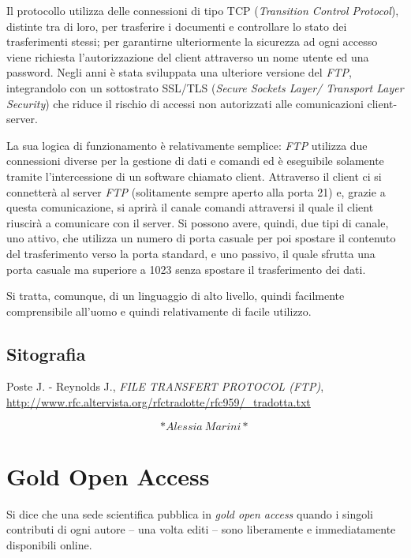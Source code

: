 \documentclass[
  b5paper,
  twoside,
  12pt,
  chapterprefix=false,
  bibliography=totocnumbered,
  parskip=false]{scrbook}
\begin{document}
Il protocollo utilizza delle connessioni di tipo TCP (\emph{Transition
Control Protocol}), distinte tra di loro, per trasferire i documenti e
controllare lo stato dei trasferimenti stessi; per garantirne
ulteriormente la sicurezza ad ogni accesso viene richiesta
l'autorizzazione del client attraverso un nome utente ed una password.
Negli anni è stata sviluppata una ulteriore versione del \emph{FTP},
integrandolo con un sottostrato SSL/TLS (\emph{Secure Sockets Layer/
Transport Layer Security}) che riduce il rischio di accessi non
autorizzati alle comunicazioni client-server.

La sua logica di funzionamento è relativamente semplice: \emph{FTP} utilizza
due connessioni diverse per la gestione di dati e comandi ed è
eseguibile solamente tramite l'intercessione di un software chiamato
client. Attraverso il client ci si connetterà al server \emph{FTP}
(solitamente sempre aperto alla porta 21) e, grazie a questa
comunicazione, si aprirà il canale comandi attraversi il quale il client
riuscirà a comunicare con il server. Si possono avere, quindi, due tipi
di canale, uno attivo, che utilizza un numero di porta casuale per poi
spostare il contenuto del trasferimento verso la porta standard, e uno
passivo, il quale sfrutta una porta casuale ma superiore a 1023 senza
spostare il trasferimento dei dati.

Si tratta, comunque, di un linguaggio di alto livello, quindi facilmente
comprensibile all'uomo e quindi relativamente di facile utilizzo.

\hypertarget{sitografia-13}{%
\section*{Sitografia}\label{sitografia-13}}

Poste J. - Reynolds J., \emph{FILE TRANSFERT PROTOCOL (FTP)},
\url{http://www.rfc.altervista.org/rfctradotte/rfc959/_tradotta.txt}

\[*Alessia~Marini*\]

\hypertarget{gold-open-access}{%
\chapter{Gold Open Access}\label{gold-open-access}}

Si dice che una sede scientifica pubblica in \emph{gold open access} quando i
singoli contributi di ogni autore -- una volta editi -- sono liberamente
e immediatamente disponibili online.
\end{document}
